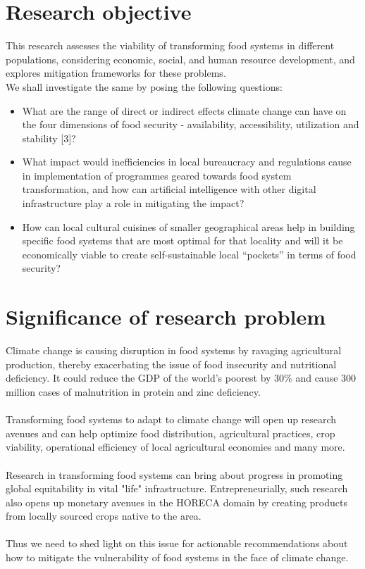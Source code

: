 \documentclass[12pt, twoside]{report}
\begin{document}
\begin{multicols}{2}
\section*{Research objective}%
This research assesses the viability of transforming food systems in different populations, considering economic, social, and human resource development, and explores mitigation frameworks for these problems. \\ 
We shall investigate the same by posing the following questions:
\begin{itemize}
	\item What are the range of direct or indirect effects climate change can have on the four dimensions of food security - availability, accessibility, utilization and stability [3]?
	\item What impact would inefficiencies in local bureaucracy and regulations cause in implementation of programmes geared towards food system transformation, and how can artificial intelligence with other digital infrastructure play a role in mitigating the impact?
	\item How can local cultural cuisines of smaller geographical areas help in building specific food systems that are most optimal for that locality and will it be economically viable to create self-sustainable local “pockets” in terms of food security?
\end{itemize}

\section*{Significance of research problem}%
Climate change is causing disruption in food systems by ravaging agricultural production, thereby exacerbating the issue of food insecurity and nutritional deficiency. It could reduce the GDP of the world’s poorest by $ 30\% $ and cause 300 million cases of malnutrition in protein and zinc deficiency. \\ \\
Transforming food systems to adapt to climate change will open up research avenues and can help optimize food distribution, agricultural practices, crop viability, operational efficiency of local agricultural economies and many more. \\ \\
Research in transforming food systems can bring about progress in promoting global equitability in vital "life" infrastructure. Entrepreneurially, such research also opens up monetary avenues in the HORECA domain by creating products from locally sourced crops native to the area. \\ \\
Thus we need to shed light on this issue for actionable recommendations about how to mitigate the vulnerability of food systems in the face of climate change.

\end{multicols}



\nocite{gregory2005}
\nocite{sova2019}
\nocite{wheeler2013}
\end{document}
